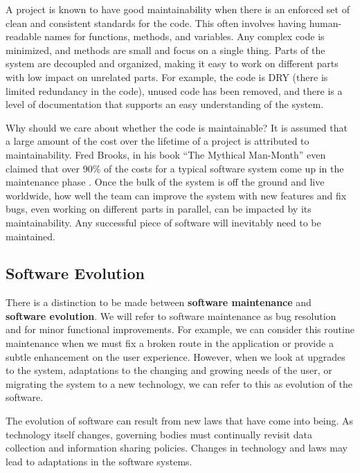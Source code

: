 A project is known to have good maintainability when there is an enforced set of clean and consistent standards for the code. This often involves having human-readable names for functions, methods, and variables. Any complex code is minimized, and methods are small and focus on a single thing. Parts of the system are decoupled and organized, making it easy to work on different parts with low impact on unrelated parts. For example, the code is DRY (there is limited redundancy in the code), unused code has been removed, and there is a level of documentation that supports an easy understanding of the system.

Why should we care about whether the code is maintainable? It is assumed that a large amount of the cost over the lifetime of a project is attributed to maintainability. Fred Brooks, in his book ``The Mythical Man-Month'' even claimed that over 90\% of the costs for a typical software system come up in the maintenance phase \cite{brooks:mythical}. Once the bulk of the system is off the ground and live worldwide, how well the team can improve the system with new features and fix bugs, even working on different parts in parallel, can be impacted by its maintainability. Any successful piece of software will inevitably need to be maintained.

\subsection{Software Evolution} \label{subSoftwareEvolution}

There is a distinction to be made between \textbf{software maintenance} and \textbf{software evolution}. We will refer to software maintenance as bug resolution and for minor functional improvements. For example, we can consider this routine maintenance when we must fix a broken route in the application or provide a subtle enhancement on the user experience. However, when we look at upgrades to the system, adaptations to the changing and growing needs of the user, or migrating the system to a new technology, we can refer to this as evolution of the software.

The evolution of software can result from new laws that have come into being. As technology itself changes, governing bodies must continually revisit data collection and information sharing policies. Changes in technology and laws may lead to adaptations in the software systems.

